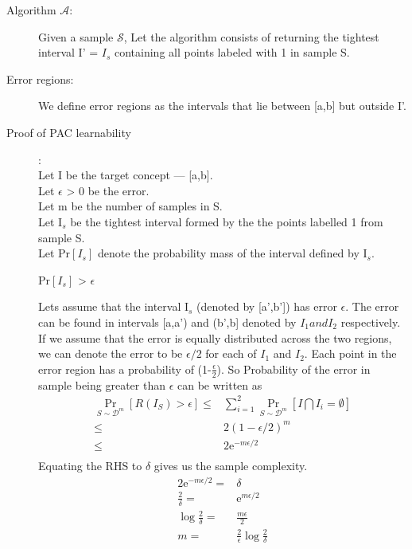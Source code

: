 \documentclass{article}
\begin{document}
\begin{description}
  \item[Algorithm \( \mathcal{A} \):] Given a sample \( \mathcal{S} \), Let the algorithm consists of returning the tightest interval I' = \(I_{s}\) containing all points labeled with 1 in sample S.
  \item[Error regions:] We define error regions as the intervals that lie between [a,b] but outside I'.
  \item[Proof of PAC learnability]:\\
    Let I be the target concept --- [a,b].\\
    Let \( \epsilon \) > 0 be the error.\\
    Let m be the number of samples in S.\\
    Let I\(_{s}\) be the tightest interval formed by the the points labelled 1 from sample S.\\
    Let Pr\([I_{s}]\) denote the probability mass of the interval defined by I\(_{s}\).\\
    \centerline{Pr\([I_{s}]\) > \( \epsilon \)}

    Lets assume that the interval I\(_{s}\) (denoted by [a',b']) has error \(\epsilon\).  The error can be found in intervals [a,a') and (b',b] denoted by \(I_{1} and I_{2} \) respectively.  If we assume that the error is equally distributed across the two regions, we can denote the error to be \(\epsilon/2\) for each of \(I_{1}\) and \(I_{2}\).  Each point in the error region has a probability of (1-\(\frac{\epsilon}{2}\)).  So Probability of the error in sample being greater than \(\epsilon \) can be written as
    \begin{align*}
      \underset{S\sim\mathcal{D}^{m}}{\Pr}[R(I_{S}) > \epsilon] \le & \sum_{i=1}^{2} \underset{S\sim\mathcal{D}^{m}}{\Pr} [{I  \bigcap I_{i} = \emptyset }]\\
      \le & {2( 1 - \epsilon/2)}^{m} \\
      \le & 2\mathrm{e}^{-m\epsilon/2}\\
    \end{align*}
    Equating the RHS to \( \delta \) gives us the sample complexity.
    \begin{align*}
      2\mathrm{e}^{-m\epsilon/2} = & \delta\\
      \frac{2}{\delta} = & \mathrm{e}^{m\epsilon/2} \\
      \log{\frac{2}{\delta}} = & \frac{m\epsilon}{2} \\
      m = & \frac{2}{\epsilon} \log{\frac{2}{\delta}}
    \end{align*}

\end{description}
\end{document}
